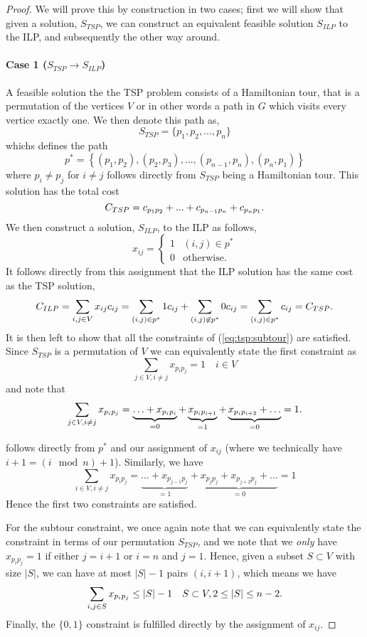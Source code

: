 \documentclass[11pt,a4paper,english]{article}
\begin{document}
 \begin{proof}
   We will prove this by construction in two cases; first
 we will show that given a solution, $S_{TSP}$, we can construct an equivalent
 feasible solution $S_{ILP}$ to the ILP, and subsequently the other way around.
 
 \paragraph{Case 1 ($S_{TSP} \to S_{ILP}$)}
 A feasible solution the the TSP problem consists of a Hamiltonian tour, that
 is a permutation of the vertices $V$ or in other words a path in $G$ which visits
  every vertice exactly one. We then denote this path as,
  $$S_{TSP} = \{p_1, p_2, ..., p_n \}$$
 whichs defines the path
  $$p^* = \left\{ (p_1, p_2), (p_2, p_3),\ldots,(p_{n-1}, p_{n}), (p_n, p_1) \right\}$$
  where $p_i \neq p_j$ for $i\neq j$ follows directly from $S_{TSP}$
   being a Hamiltonian tour. This solution has the total cost
  $$C_{{TSP}} = c_{p_1p_2} + ... + c_{p_{n-1}p_{n}} + c_{p_{n}p_1}\mathnormal{.}$$
  We then construct a solution, $S_{ILP}$, to the ILP as follows,
  $$x_{ij} =
  \begin{cases}
    1 & (i,j) \in p^* \\
    0 & \text{otherwise.}
  \end{cases}
  $$
  It follows directly from this assignment that the ILP
  solution has the same cost as the TSP solution,
$$C_{ILP} = \sum_{i,j \in V} x_{ij}c_{ij} = \sum_{(i,j) \in p^*} 1c_{ij} + \sum_{(i,j) \not\in p^*} 0c_{ij} =  \sum_{(i,j) \in p^*} c_{ij} = C_{{TSP}}\mathnormal{.}$$
It is then left to show that all the constraints of (\ref{eq:tsp:subtour}) are
satisfied. Since $S_{TSP}$ is a permutation of $V$ we can equivalently state
the first constraint as
$$\sum_{j \in V, i \neq j} x_{p_ip_j} = 1 \quad i \in V$$
and note that
$$\sum_{j \in V, i \neq j} x_{p_ip_j} = \underbrace{\ldots + x_{p_i p_i}}_{=0} +
\underbrace{x_{p_i p_{i+1}}}_{=1} + \underbrace{x_{p_i p_{i+2}} + \ldots}_{=0} = 1\mathnormal{.}$$

follows directly from $p^*$ and our assignment of $x_{ij}$ (where we technically
 have $i+1 = (i \mod n) + 1$). Similarly, we have
$$\sum_{i \in V, i \neq j} x_{p_ip_j} = \underbrace{\ldots + x_{p_{j-1} p_j}}_{=1} +
\underbrace{x_{p_{j} p_j} + x_{p_{j+2} p_j} + \ldots}_{=0} = 1$$
Hence the first two constraints are satisfied.

For the subtour constraint, we once again note that we can equivalently state
the constraint in terms of our permutation $S_{TSP}$, and we note that we
\textit{only} have $x_{p_i p_j} = 1$ if either $j = i + 1$ or $i = n$ and $j = 1$.
Hence, given a subset $S \subset V$ with size $|S|$, we can have at most
$|S| - 1$ pairs $(i, i+1)$, which means we have
$$\sum_{i,j \in S} x_{p_i p_j} \leq |S| - 1 \quad S \subset V, 2 \leq |S| \leq n-2\mathnormal{.}$$
Finally, the $\{0,1\}$ constraint is fulfilled directly by the
assignment of $x_{ij}$.

\end{proof}
\end{document}
